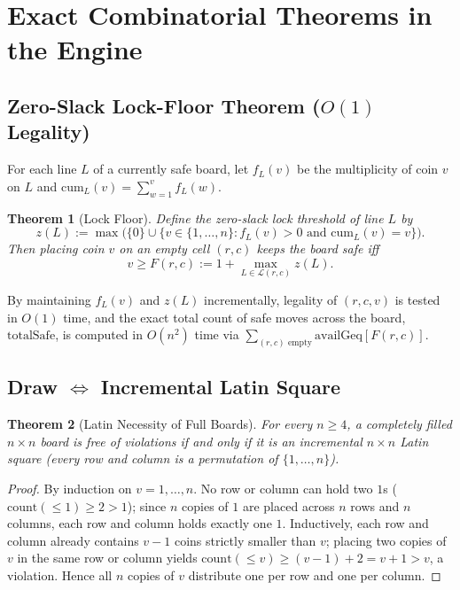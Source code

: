 \documentclass[10pt,a4paper]{article}
\newtheorem{theorem}{Theorem}[section]
\theoremstyle{remark}
\begin{document}
\section{Exact Combinatorial Theorems in the Engine}

\subsection{\texorpdfstring{Zero-Slack Lock-Floor Theorem ($O(1)$ Legality)}{Zero-Slack Lock-Floor Theorem (O(1) Legality)}}

For each line $L$ of a currently safe board, let $f_L(v)$ be the multiplicity of coin $v$ on $L$ and $\mathrm{cum}_L(v) = \sum_{w=1}^{v} f_L(w)$.

\begin{theorem}[Lock Floor]
Define the zero-slack lock threshold of line $L$ by
\[
  z(L) := \max\bigl(\{0\} \cup \{v \in \{1,\dots,n\} : f_L(v) > 0 \text{ and } \mathrm{cum}_L(v) = v\}\bigr).
\]
Then placing coin $v$ on an empty cell $(r,c)$ keeps the board safe iff
\[
  v \ge F(r,c) := 1 + \max_{L \in \mathcal{L}(r,c)} z(L).
\]
\end{theorem}

By maintaining $f_L(v)$ and $z(L)$ incrementally, legality of $(r,c,v)$ is tested in $O(1)$ time, and the exact total count of safe moves across the board, $\mathrm{totalSafe}$, is computed in $O(n^2)$ time via $\sum_{(r,c)\text{ empty}} \mathrm{availGeq}[F(r,c)]$.

\subsection{\texorpdfstring{Draw $\Longleftrightarrow$ Incremental Latin Square}{Draw <=> Incremental Latin Square}}

\begin{theorem}[Latin Necessity of Full Boards]\label{thm:draw-latin}
For every $n \ge 4$, a completely filled $n \times n$ board is free of violations if and only if it is an incremental $n \times n$ Latin square (every row and column is a permutation of $\{1,\dots,n\}$).
\end{theorem}

\begin{proof}
By induction on $v = 1,\dots,n$. No row or column can hold two $1$s ($\mathrm{count}(\le 1) \ge 2 > 1$); since $n$ copies of $1$ are placed across $n$ rows and $n$ columns, each row and column holds exactly one $1$. Inductively, each row and column already contains $v-1$ coins strictly smaller than $v$; placing two copies of $v$ in the same row or column yields $\mathrm{count}(\le v) \ge (v-1)+2 = v+1 > v$, a violation. Hence all $n$ copies of $v$ distribute one per row and one per column.
\end{proof}
\end{document}
